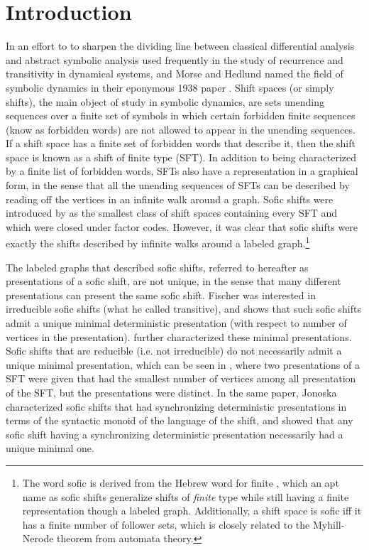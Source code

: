 \documentclass[hidelinks]{report}
\theoremstyle{definition}
\begin{document}
\setcounter{page}{3}
\tableofcontents

\chapter{Introduction}



In an effort to to sharpen the dividing 
line between classical differential analysis and abstract symbolic analysis
used frequently in the study of recurrence and transitivity in dynamical systems, 
and Morse and Hedlund named the field of symbolic dynamics in their eponymous 
1938 paper \cite{morse1938symbolic}. Shift spaces (or simply shifts), the main object 
of study in symbolic dynamics, are sets unending sequences over a finite set of 
symbols in which certain forbidden finite sequences (know as forbidden words)
are not allowed to appear in the unending sequences. If a shift space has a finite set of 
forbidden words that describe it, then the shift space is known as a shift 
of finite type (SFT). In addition to being characterized by a 
finite list of forbidden words, SFTs also have a representation in a graphical 
form, in the sense that all the unending sequences of SFTs can be 
described by reading off the vertices in an infinite walk around a graph.
Sofic shifts were introduced by \cite{weiss1973subshifts} as the smallest 
class of shift spaces containing every SFT and which were closed under 
factor codes. However, it was clear that sofic 
shifts were exactly the shifts described by infinite walks around 
a labeled graph.\footnote{The word sofic is derived from the Hebrew word 
for finite \cite{lind1995introduction}, which an apt name as sofic shifts 
generalize shifts of \textit{finite} type while still having a finite 
representation though a labeled graph. Additionally, a shift space is sofic 
iff it has a finite number of follower sets, which is closely related 
to the Myhill-Nerode theorem from automata theory.}

The labeled graphs that described sofic shifts, referred to hereafter as presentations
of a sofic shift, are not unique, in the sense that many different presentations 
can present the same sofic shift. Fischer \cite{fischer1975sofic} was interested in 
irreducible sofic shifts (what he called transitive), and shows that such sofic shifts admit 
a unique minimal deterministic presentation (with respect to number of vertices in the presentation).
\cite{jonoska1994minimal} further characterized these minimal presentations.
Sofic shifts that are reducible (i.e. not irreducible) do not 
necessarily admit a unique minimal presentation, which can be seen in \cite{jonoska1996sofic},  
where two presentations of a SFT were given that had the smallest number of 
vertices among all presentation of the SFT, but the presentations were distinct.
In the same paper, Jonoska characterized sofic shifts that had
synchronizing deterministic presentations in terms of the syntactic monoid 
of the language of the shift, and showed that any sofic shift having 
a synchronizing deterministic presentation necessarily had a unique 
minimal one.
\end{document}
